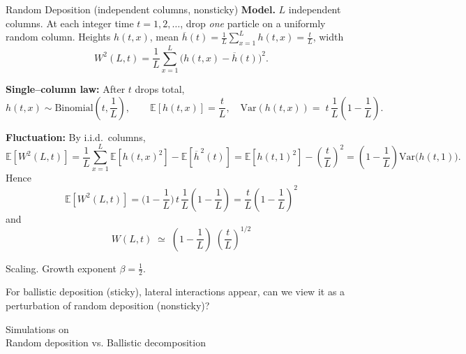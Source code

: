 \documentclass[9pt,table,xcolor=dvipsnames]{beamer}
\begin{document}
\begin{frame}[t]{Random Deposition (independent columns, nonsticky)}
  \small \textbf{Model.} $L$ independent columns. At each integer time $t =
  1,2,\dots$, drop \emph{one} particle on a uniformly random column. Heights
  $h(t,x)$, mean $\overline h(t)=\frac1L\sum_{x=1}^L h(t,x) = \frac{t}{L}$,
  width
  \[
    W^2(L,t)=\frac1L\sum_{x=1}^L \big(h(t,x)-\overline h(t)\big)^2.
  \]

  \pause\medskip\textbf{Single--column law:} After $t$ drops total,
  \[
    h(t,x)\sim \mathrm{Binomial}\!\left(t,\frac1L\right),\qquad
    \mathbb E[h(t,x)]=\frac{t}{L},\quad \mathrm{Var}(h(t,x))=\;t\,\frac1L\!\left(1-\frac1L\right).
  \]

  \pause\medskip\textbf{Fluctuation:} By i.i.d.\ columns,
  \[
    \mathbb E\!\left[W^2(L,t)\right]
    =\frac1L\sum_{x=1}^L\mathbb E\left[h(t,x)^2\right] - \mathbb E\left[\overline h^{\,2}(t)\right]
    =\mathbb E\left[h(t,1)^2\right] - \left(\frac{t}{L}\right)^2
    =\left(1-\frac1L\right) \mathrm{Var}\!\big(h(t,1)\big).
  \]
  Hence
  \[
    \boxed{\;\mathbb E\!\left[W^2(L,t)\right]
    =\Big(1-\frac1L\Big)\,t\,\frac1L\!\left(1-\frac1L\right)
    =\frac{t}{L}\left(1-\frac1L\right)^{\!2}\;}
  \]
  and
  \[
    \boxed{\,W(L,t)\; \simeq \;\left(1-\frac1L\right)\;\left(\frac{t}{L}\right)^{1/2}\,}
  \]

  \medskip \alert{Scaling.} Growth exponent \( \displaystyle \beta = \frac12\).

\end{frame}
\begin{frame}[fragile] %
  For ballistic deposition (sticky), lateral interactions appear, can we view it
  as a perturbation of random deposition (nonsticky)?
\end{frame}
\begin{frame}[fragile] %
  \begin{center}
    \Large Simulations on \\ \bigskip
    Random deposition vs. Ballistic decomposition
  \end{center}
\end{frame}
\end{document}
